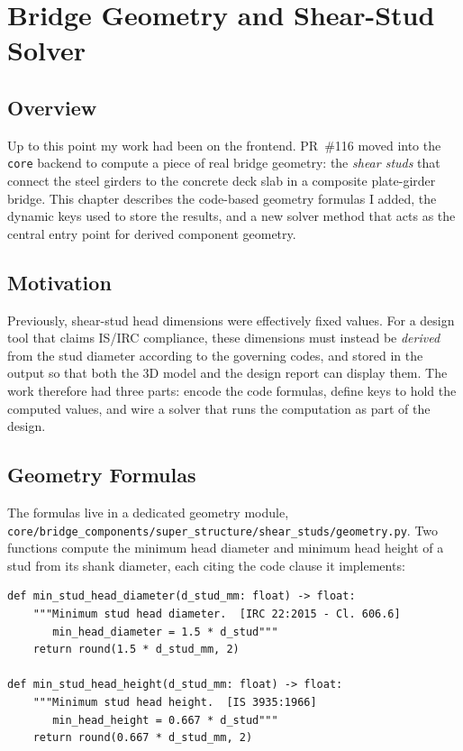 \chapter{Bridge Geometry and Shear-Stud Solver}
\label{ch:geometry}

\section{Overview}
Up to this point my work had been on the frontend. PR~\#116 moved into the \texttt{core}
backend to compute a piece of real bridge geometry: the \emph{shear studs} that connect the
steel girders to the concrete deck slab in a composite plate-girder bridge. This chapter
describes the code-based geometry formulas I added, the dynamic keys used to store the results,
and a new solver method that acts as the central entry point for derived component geometry.

\section{Motivation}
Previously, shear-stud head dimensions were effectively fixed values. For a design tool that
claims IS/IRC compliance, these dimensions must instead be \emph{derived} from the stud
diameter according to the governing codes, and stored in the output so that both the 3D model
and the design report can display them. The work therefore had three parts: encode the code
formulas, define keys to hold the computed values, and wire a solver that runs the computation
as part of the design.

\section{Geometry Formulas}
The formulas live in a dedicated geometry module,
\texttt{core/bridge\_components/super\_structure/shear\_studs/geometry.py}. Two functions
compute the minimum head diameter and minimum head height of a stud from its shank diameter,
each citing the code clause it implements:

\begin{lstlisting}[caption={Code-based shear-stud head geometry (\texttt{shear\_studs/geometry.py}).},label={lst:studgeom}]
def min_stud_head_diameter(d_stud_mm: float) -> float:
    """Minimum stud head diameter.  [IRC 22:2015 - Cl. 606.6]
       min_head_diameter = 1.5 * d_stud"""
    return round(1.5 * d_stud_mm, 2)

def min_stud_head_height(d_stud_mm: float) -> float:
    """Minimum stud head height.  [IS 3935:1966]
       min_head_height = 0.667 * d_stud"""
    return round(0.667 * d_stud_mm, 2)
\end{lstlisting}

